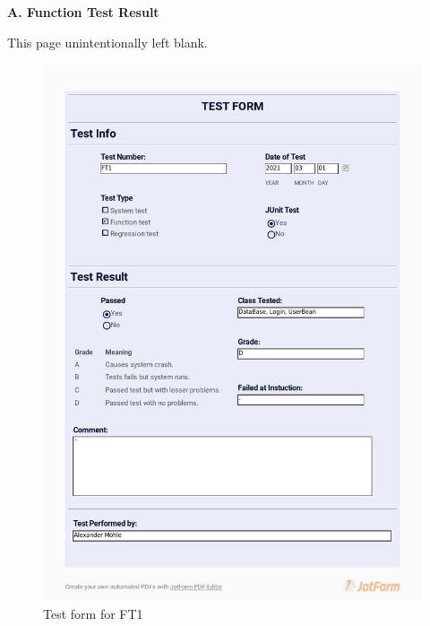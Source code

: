 \documentclass{article}
\begin{document}
\newpage
\begin{flushleft}
{\large\textbf{A. Function Test Result}}
\end{flushleft}

\vspace*{\fill}
                \hfill
                \begin{center}
                This page unintentionally left blank.
                \end{center}
                \vspace{\fill}
                \thispagestyle{empty}

\begin{figure}
     \centering
     \includegraphics[width=13cm]{images/2021_03_01_Alexander_FT1_001}
     \renewcommand\figurename{Figure}
     \caption{Test form for FT1}
     \label{fig:my_label}
 \end{figure}
 
\end{document}
